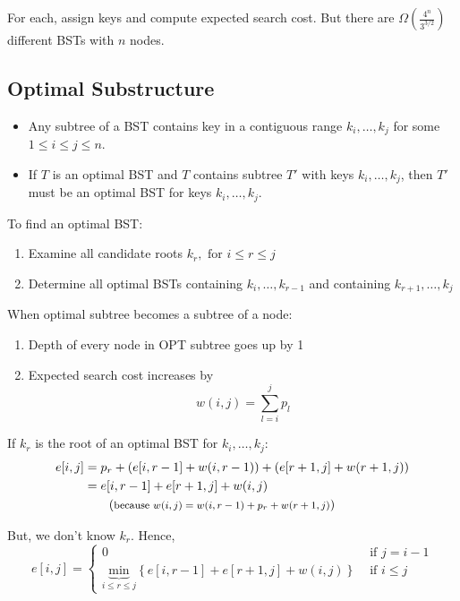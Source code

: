 \documentclass{article}
\begin{document}
For each, assign keys and compute expected search cost.
But there are \(\Omega(\frac{4^n}{3^{3/2}})\) different BSTs with \(n\) nodes.

\subsection*{Optimal Substructure}
\begin{itemize}
    \item Any subtree of a BST contains key in a contiguous range \(k_i, \ldots,
          k_j\) for some \(1 \leq i \leq j \leq n\).
    \item If \(T\) is an optimal BST and \(T\) contains subtree \(T'\) with keys
          \(k_i, \ldots, k_j\), then \(T'\) must be an optimal BST for keys \(k_i,
          \ldots, k_j\).
\end{itemize}

To find an optimal BST:
\begin{enumerate}
    \item Examine all candidate roots \(k_r, \text{ for } i \leq r \leq j\)
    \item Determine all optimal BSTs containing \(k_i, \ldots, k_{r-1}\) and
          containing \(k_{r+1}, \ldots, k_j\)
\end{enumerate}

When optimal subtree becomes a subtree of a node:
\begin{enumerate}
    \item Depth of every node in OPT subtree goes up by 1
    \item Expected search cost increases by \[w(i, j) = \sum_{l=i}^{j}p_l\]
\end{enumerate}

If \(k_r\) is the root of an optimal BST for \(k_i, \ldots, k_j\):
\begin{align*}
    e[i, j] & = p_r + \left(e[i, r-1] + w(i, r-1)\right) + (e[r+1, j] + w(r+1, j))       \\
            & = e[i, r-1] + e[r+1, j] + w(i, j)                                          \\
            & \qquad (\text{\footnotesize because \(w(i, j) = w(i, r-1) + p_r + w(r + 1, j)\)})
\end{align*}

But, we don't know \(k_r\). Hence,
\begin{equation*}
    e[i, j] = \begin{cases}
        0                                                                                       & \text{ if } j = i -1 \\
        \underbrace{\text{min}}_{i \leq r \leq j}\left\{e[i, r-1] + e[r+1, j] + w(i, j)\right\} & \text{ if } i \leq j
    \end{cases}
\end{equation*}
\end{document}
